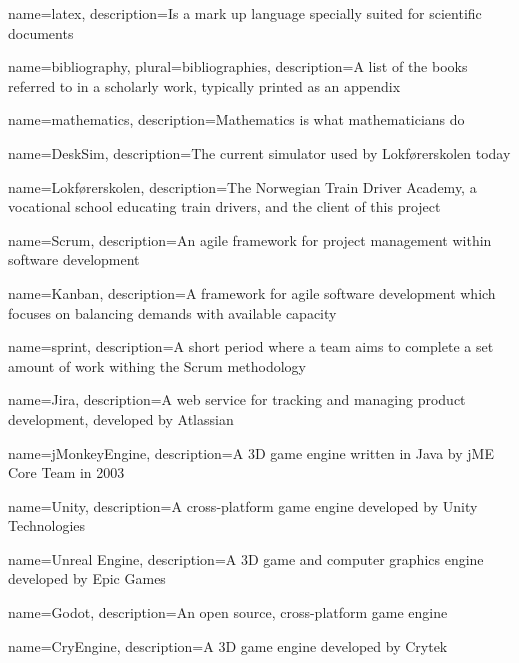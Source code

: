 

\makeglossaries %


{
        name=latex,
        description={Is a mark up language specially suited for
scientific documents}
}

{
        name=bibliography,
        plural=bibliographies,
        description={A list of the books referred to in a scholarly work,
typically printed as an appendix}
}

{
    name=mathematics,
    description={Mathematics is what mathematicians do}
}

{
    name=DeskSim,
    description={The current simulator used by Lokførerskolen today}
}

{
    name=Lokførerskolen,
    description={The Norwegian Train Driver Academy, a vocational school educating train drivers, and the client of this project}
}

{
    name=Scrum,
    description={An agile framework for project management within software development}
}

{
    name=Kanban,
    description={A framework for agile software development which focuses on balancing demands with available capacity}
}

{
    name=sprint,
    description={A short period where a team aims to complete a set amount of work withing the Scrum methodology}
}

{
    name=Jira,
    description={A web service for tracking and managing product development, developed by Atlassian}
}

{
    name=jMonkeyEngine,
    description={A 3D game engine written in Java by jME Core Team in 2003}
}

{
    name=Unity,
    description={A cross-platform game engine developed by Unity Technologies}
}

{
    name=Unreal Engine,
    description={A 3D game and computer graphics engine developed by Epic Games}
}

{
    name=Godot,
    description={An open source, cross-platform game engine}
}

{
    name=CryEngine,
    description={A 3D game engine developed by Crytek}
}

